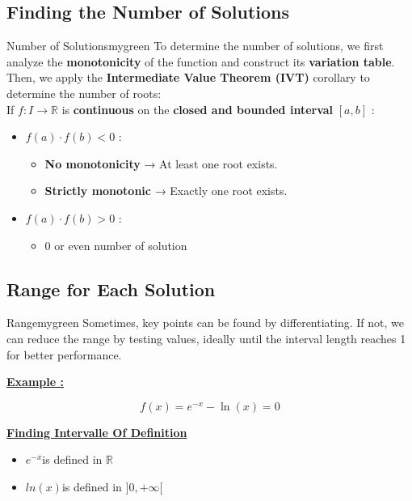 \subsection{Finding the Number of Solutions}
\begin{prettyBox}{Number of Solutions}{mygreen}
To determine the number of solutions, we first analyze the \textbf{monotonicity} of the function and construct its \textbf{variation table}.  
Then, we apply the \textbf{Intermediate Value Theorem (IVT)} corollary to determine the number of roots: \\[0.15cm]

If \( f: I \to \mathbb{R} \) is \textbf{continuous} on the \textbf{closed and bounded interval} \([a, b]\) :
\begin{itemize}
    \item \( f(a) \cdot f(b) < 0 \) :
        \begin{itemize}
    \item \textbf{No monotonicity} → At least one root exists.
    \item \textbf{Strictly monotonic} → Exactly one root exists.
        \end{itemize}
    \item \( f(a) \cdot f(b) > 0 \) :
        \begin{itemize}
    \item 0 or even number of solution
        \end{itemize}
\end{itemize}
\end{prettyBox}

\vspace{0.5cm}


\subsection{Range for Each Solution}
\begin{prettyBox}{Range}{mygreen}
 Sometimes, key points can be found by differentiating.  
 If not, we can reduce the range by testing values,  
 ideally until the interval length reaches 1 for better performance.
\end{prettyBox}

\newpage

\textbf{\underline{Example :}}

\[f(x) = e^{-x} - \ln(x) = 0\]

\textbf{\underline{Finding Intervalle Of Definition}}
\begin{itemize}
    \item \(e^{-x}\)\hspace{0.2cm}is defined in \(\mathbb{R}\)
    \item \(ln(x)\)\hspace{0.2cm}is defined in \(]0,+\infty[\)
\end{itemize}

